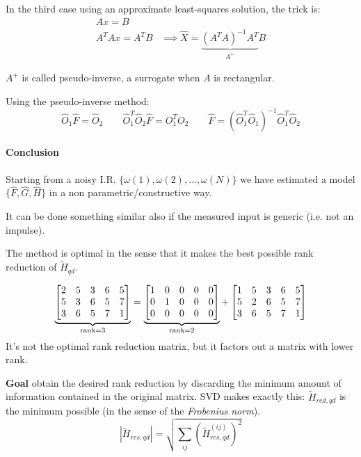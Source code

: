 In the third case using an approximate least-squares solution, the trick is:
\begin{align*}
    Ax = B \\
    A^TAx = A^TB & \implies \hat{X} = \underbrace{(A^TA)^{-1}A^T}_{A^+} B
\end{align*}

$A^+$ is called pseudo-inverse, a surrogate when $A$ is rectangular.

Using the pseudo-inverse method:
\[
    \hat{O}_1\hat{F} = \hat{O}_2 \qquad \hat{O}_1^T\hat{O}_2\hat{F} = O_1^TO_2 \qquad \hat{F} = \left(\hat{O}_1^T\hat{O}_1\right)^{-1} \hat{O}_1^T\hat{O}_2
\]

\paragraph{Conclusion} Starting from a noisy I.R. $\{\omega(1), \omega(2), \ldots, \omega(N)\}$ we have estimated a model $\{\hat{F}, \hat{G}, \hat{H}\}$ in a non parametric/constructive way.

\begin{remark}
    It can be done something similar also if the measured input is generic (i.e. not an impulse).
\end{remark}

\begin{remark}
    The method is optimal in the sense that it makes the best possible rank reduction of $\tilde{H}_{qd}$.
\end{remark}

\begin{example}
    \[
        \underbrace{\begin{bmatrix}
            2 & 5 & 3 & 6 & 5 \\
            5 & 3 & 6 & 5 & 7 \\
            3 & 6 & 5 & 7 & 1
        \end{bmatrix}}_{\operatorname{rank} = 3}
        =
        \underbrace{\begin{bmatrix}
            1 & 0 & 0 & 0 & 0 \\
            0 & 1 & 0 & 0 & 0 \\
            0 & 0 & 0 & 0 & 0
        \end{bmatrix}}_{\operatorname{rank} = 2}
        +
        \begin{bmatrix}
            1 & 5 & 3 & 6 & 5 \\
            5 & 2 & 6 & 5 & 7 \\
            3 & 6 & 5 & 7 & 1
        \end{bmatrix}
    \]
    It's not the optimal rank reduction matrix, but it factors out a matrix with lower rank.

    \textbf{Goal} obtain the desired rank reduction by discarding the minimum amount of information contained in the original matrix.
    SVD makes exactly this: $\tilde{H}_{red,qd}$ is the minimum possible (in the sense of the \emph{Frobenius norm}).
    \[
        \left|\tilde{H}_{res,qd}\right| = \sqrt{\sum_{ij} \left(\tilde{H}_{res,qd}^{(ij)} \right)^2}
    \]
\end{example}

